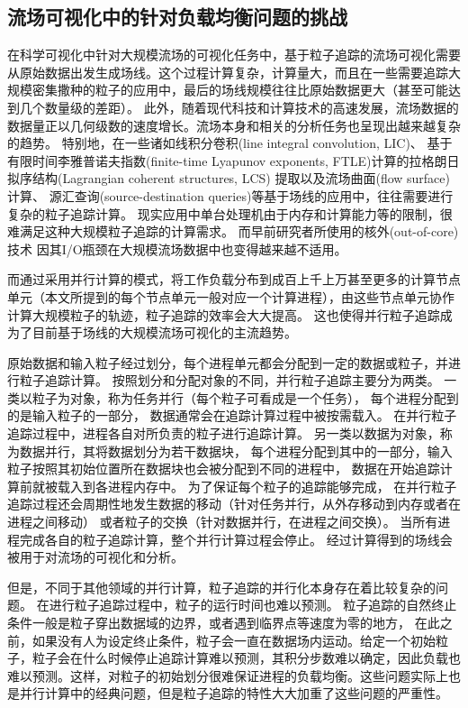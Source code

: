 \subsection{流场可视化中的针对负载均衡问题的挑战}
在科学可视化中针对大规模流场的可视化任务中，基于粒子追踪的流场可视化需要从原始数据出发生成场线。这个过程计算复杂，计算量大，而且在一些需要追踪大规模密集撒种的粒子的应用中，最后的场线规模往往比原始数据更大（甚至可能达到几个数量级的差距）。
此外，随着现代科技和计算技术的高速发展，流场数据的数据量正以几何级数的速度增长。流场本身和相关的分析任务也呈现出越来越复杂的趋势。
特别地，在一些诸如线积分卷积(line integral convolution, LIC)\parencite{CabralL93,ShenK97}、
基于有限时间李雅普诺夫指数(finite-time Lyapunov exponents, FTLE)计算的拉格朗日拟序结构(Lagrangian coherent structures, LCS)
提取\parencite{Haller2001,GarthGTH07}以及流场曲面(flow surface)计算\parencite{EdmundsLCMZW12}、
源汇查询(source-destination queries)\parencite{KendallWAPHE11}等基于场线的应用中，往往需要进行复杂的粒子追踪计算。
现实应用中单台处理机由于内存和计算能力等的限制，很难满足这种大规模粒子追踪的计算需求。
而早前研究者所使用的核外(out-of-core)技术\parencite{silva2002out,BruckschenKHJ01,EllsworthGM04}
因其I/O瓶颈在大规模流场数据中也变得越来越不适用。

而通过采用并行计算的模式，将工作负载分布到成百上千上万甚至更多的计算节点单元（本文所提到的每个节点单元一般对应一个计算进程），由这些节点单元协作计算大规模粒子的轨迹，粒子追踪的效率会大大提高。
这也使得并行粒子追踪成为了目前基于场线的大规模流场可视化的主流趋势。

原始数据和输入粒子经过划分，每个进程单元都会分配到一定的数据或粒子，并进行粒子追踪计算。
按照划分和分配对象的不同，并行粒子追踪主要分为两类。
一类以粒子为对象，称为任务并行（每个粒子可看成是一个任务），
每个进程分配到的是输入粒子的一部分，
数据通常会在追踪计算过程中被按需载入。
在并行粒子追踪过程中，进程各自对所负责的粒子进行追踪计算。
另一类以数据为对象，称为数据并行，其将数据划分为若干数据块，
每个进程分配到其中的一部分，输入粒子按照其初始位置所在数据块也会被分配到不同的进程中，
数据在开始追踪计算前就被载入到各进程内存中。
为了保证每个粒子的追踪能够完成，
在并行粒子追踪过程还会周期性地发生数据的移动（针对任务并行，从外存移动到内存或者在进程之间移动）
或者粒子的交换（针对数据并行，在进程之间交换）。
当所有进程完成各自的粒子追踪计算，整个并行计算过程会停止。
经过计算得到的场线会被用于对流场的可视化和分析。


但是，不同于其他领域的并行计算，粒子追踪的并行化本身存在着比较复杂的问题。 
在进行粒子追踪过程中，粒子的运行时间也难以预测。
粒子追踪的自然终止条件一般是粒子穿出数据域的边界，或者遇到临界点等速度为零的地方，
在此之前，如果没有人为设定终止条件，粒子会一直在数据场内运动。给定一个初始粒子，粒子会在什么时候停止追踪计算难以预测，其积分步数难以确定，因此负载也难以预测。这样，对粒子的初始划分很难保证进程的负载均衡。这些问题实际上也是并行计算中的经典问题，但是粒子追踪的特性大大加重了这些问题的严重性。

